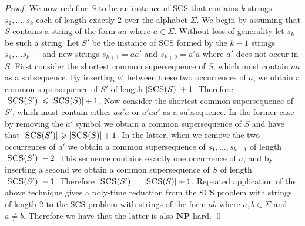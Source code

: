 \documentclass[a4paper,11pt]{llncs}
\newcounter{l}
\renewcommand{\geq}{\geqslant}
\renewcommand{\leq}{\leqslant}
\newcommand{\NPtime}{\ensuremath{\mathbf{NP}}}
\newcommand{\SCS}{\textsc{SCS}}
\begin{document}
\begin{proof}
We now redefine $S$ to be an instance of \SCS{} that contains $k$ strings $s_1,\ldots,s_k$ each of length exactly $2$ over the alphabet $\Sigma$. We begin by assuming that $S$ contains a string of the form $aa$ where $a \in \Sigma$. Without loss of generality let $s_k$ be such a string. Let $S'$ be the instance of \SCS{} formed by the $k-1$ strings $s_1,\ldots s_{k-1}$ and new strings $s_{k+1}=aa'$ and $s_{k+2}=a'a$ where $a'$ does not occur in $S$. First consider the shortest common supersequence of $S$, which must contain $aa$ as a subsequence. By inserting $a'$ between these two occurrences of $a$, we obtain a common supersequence of $S'$ of length $|\SCS{}(S)|+1$. Therefore $|\SCS{}(S')| \leq |\SCS{}(S)|+1$. Now consider the shortest common supersequence of $S'$, which must contain either $aa'a$ or $a'aa'$ as a subsequence. In the former case by removing the $a'$ symbol we obtain a common supersequence of $S$ and have that $|\SCS{}(S')| \geq |\SCS{}(S)|+1$. In the latter, when we remove the two occurrences of $a'$ we obtain a common supersequence of $s_1,\ldots, s_{k-1}$ of length $|\SCS{}(S')|-2$. This sequence contains exactly one occurrence of $a$, and by inserting a second we obtain a common supersequence of $S$ of length $|\SCS{}(S')|-1$. Therefore $|\SCS{}(S')| = |\SCS{}(S)|+1$. Repeated application of the above technique gives a poly-time reduction from the \SCS{} problem with strings of length $2$ to  the \SCS{} problem with strings of the form $ab$ where $a,b \in \Sigma$ and $a \neq b$. Therefore we have that the latter is also \NPtime-hard. \qed
\end{proof}
\end{document}
